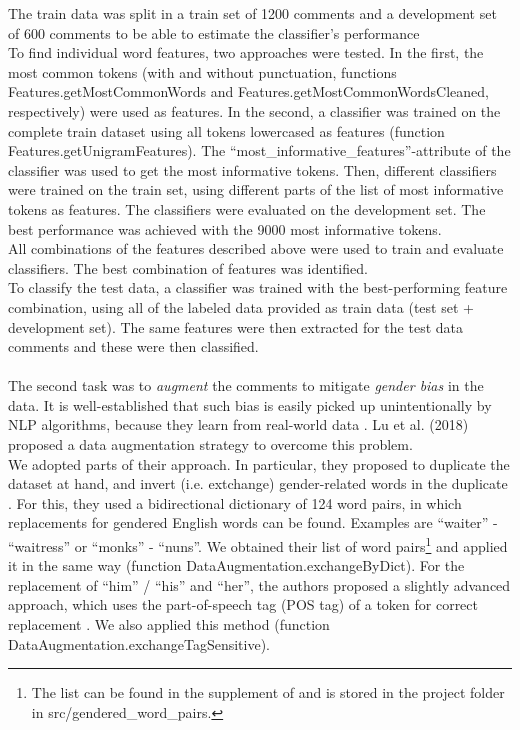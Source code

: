 \documentclass[11pt,a4paper]{article}
\begin{document}
The train data was split in a train set of 1200 comments and a development set of 600 comments to be able to estimate the classifier's performance\\
To find individual word features, two approaches were tested. In the first, the most common tokens (with and without punctuation, functions Features.getMostCommonWords and Features.getMostCommonWordsCleaned, respectively) were used as features. In the second, a classifier was trained on the complete train dataset using all tokens lowercased as features (function Features.getUnigramFeatures). The ``most\_informative\_features''-attribute of the classifier was used to get the most informative tokens. Then, different classifiers were trained on the train set, using different parts of the list of most informative tokens as features. The classifiers were evaluated on the development set. The best performance was achieved with the 9000 most informative tokens.\\
All combinations of the features described above were used to train and evaluate classifiers. The best combination of features was identified. \\
To classify the test data, a classifier was trained with the best-performing feature combination, using all of the labeled data provided as train data (test set + development set). The same features were then extracted for the test data comments and these were then classified.\\
\\
The second task was to \textit{augment} the comments to mitigate \textit{gender bias} in the data. It is well-established that such bias is easily picked up unintentionally by NLP algorithms, because they learn from real-world data \cite{Lu2018}. Lu et al. (2018) proposed a data augmentation strategy to overcome this problem. \\
We adopted parts of their approach. In particular, they proposed to duplicate the dataset at hand, and invert (i.e. extchange) gender-related words in the duplicate \cite{Lu2018}. For this, they used a bidirectional dictionary of 124 word pairs, in which replacements for gendered English words can be found. Examples are ``waiter'' - ``waitress'' or ``monks'' - ``nuns''. We obtained their list of word pairs\footnote{The list can be found in the supplement of \cite{Lu2018} and is stored in the project folder in src/gendered\_word\_pairs.} and applied it in the same way (function DataAugmentation.exchangeByDict). For the replacement of ``him'' / ``his'' and ``her'', the authors proposed a slightly advanced approach, which uses the part-of-speech tag (POS tag) of a token for correct replacement \cite{Lu2018}. We also applied this method (function DataAugmentation.exchangeTagSensitive).\\
\end{document}
